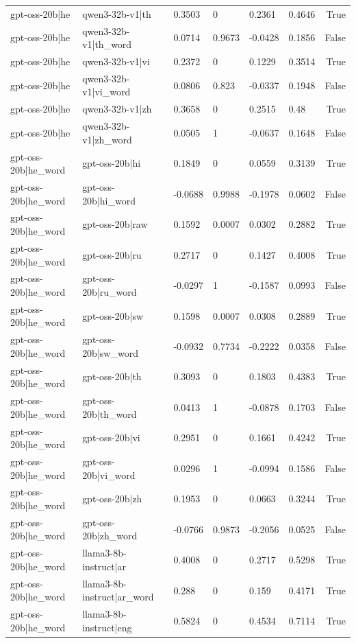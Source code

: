 \begin{table}
\begin{tabular}{llllllr}
gpt-oss-20b|he & qwen3-32b-v1|th & 0.3503 & 0 & 0.2361 & 0.4646 & True \\
gpt-oss-20b|he & qwen3-32b-v1|th_word & 0.0714 & 0.9673 & -0.0428 & 0.1856 & False \\
gpt-oss-20b|he & qwen3-32b-v1|vi & 0.2372 & 0 & 0.1229 & 0.3514 & True \\
gpt-oss-20b|he & qwen3-32b-v1|vi_word & 0.0806 & 0.823 & -0.0337 & 0.1948 & False \\
gpt-oss-20b|he & qwen3-32b-v1|zh & 0.3658 & 0 & 0.2515 & 0.48 & True \\
gpt-oss-20b|he & qwen3-32b-v1|zh_word & 0.0505 & 1 & -0.0637 & 0.1648 & False \\
gpt-oss-20b|he_word & gpt-oss-20b|hi & 0.1849 & 0 & 0.0559 & 0.3139 & True \\
gpt-oss-20b|he_word & gpt-oss-20b|hi_word & -0.0688 & 0.9988 & -0.1978 & 0.0602 & False \\
gpt-oss-20b|he_word & gpt-oss-20b|raw & 0.1592 & 0.0007 & 0.0302 & 0.2882 & True \\
gpt-oss-20b|he_word & gpt-oss-20b|ru & 0.2717 & 0 & 0.1427 & 0.4008 & True \\
gpt-oss-20b|he_word & gpt-oss-20b|ru_word & -0.0297 & 1 & -0.1587 & 0.0993 & False \\
gpt-oss-20b|he_word & gpt-oss-20b|sw & 0.1598 & 0.0007 & 0.0308 & 0.2889 & True \\
gpt-oss-20b|he_word & gpt-oss-20b|sw_word & -0.0932 & 0.7734 & -0.2222 & 0.0358 & False \\
gpt-oss-20b|he_word & gpt-oss-20b|th & 0.3093 & 0 & 0.1803 & 0.4383 & True \\
gpt-oss-20b|he_word & gpt-oss-20b|th_word & 0.0413 & 1 & -0.0878 & 0.1703 & False \\
gpt-oss-20b|he_word & gpt-oss-20b|vi & 0.2951 & 0 & 0.1661 & 0.4242 & True \\
gpt-oss-20b|he_word & gpt-oss-20b|vi_word & 0.0296 & 1 & -0.0994 & 0.1586 & False \\
gpt-oss-20b|he_word & gpt-oss-20b|zh & 0.1953 & 0 & 0.0663 & 0.3244 & True \\
gpt-oss-20b|he_word & gpt-oss-20b|zh_word & -0.0766 & 0.9873 & -0.2056 & 0.0525 & False \\
gpt-oss-20b|he_word & llama3-8b-instruct|ar & 0.4008 & 0 & 0.2717 & 0.5298 & True \\
gpt-oss-20b|he_word & llama3-8b-instruct|ar_word & 0.288 & 0 & 0.159 & 0.4171 & True \\
gpt-oss-20b|he_word & llama3-8b-instruct|eng & 0.5824 & 0 & 0.4534 & 0.7114 & True \\

\end{tabular}
\end{table}
